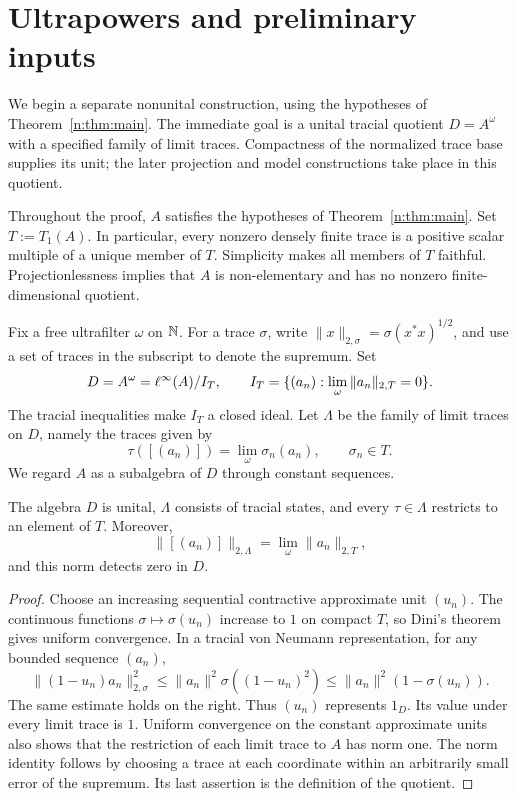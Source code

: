 \section{Ultrapowers and preliminary inputs}\label{n:sec:framework}

We begin a separate nonunital construction, using the hypotheses of Theorem~\ref{n:thm:main}. The immediate goal is a unital tracial quotient $D=A^\omega$ with a specified family of limit traces. Compactness of the normalized trace base supplies its unit; the later projection and model constructions take place in this quotient.

Throughout the proof, $A$ satisfies the hypotheses of
Theorem~\ref{n:thm:main}. Set $T:=T_1(A)$. In particular, every nonzero densely finite trace is
a positive scalar multiple of a unique member of $T$. Simplicity makes
all members of $T$ faithful. Projectionlessness implies that $A$ is
non-elementary and has no nonzero finite-dimensional quotient.

Fix a free ultrafilter $\omega$ on $\mathbb N$. For a trace $\sigma$, write
$\|x\|_{2,\sigma}=\sigma(x^*x)^{1/2}$, and use a set of traces in the
subscript to denote the supremum. Set
\[
 D=A^\omega=\ell^\infty(A)/I_T,\qquad
 I_T=\{(a_n):\lim_\omega\|a_n\|_{2,T}=0\}.
\]
The tracial inequalities make $I_T$ a closed ideal. Let $\Lambda$ be the family
of limit traces on $D$, namely the traces given by
\[
 \tau([(a_n)])=\lim_\omega\sigma_n(a_n),\qquad \sigma_n\in T.
\]
We regard $A$ as a subalgebra of $D$ through constant sequences.

\begin{lemma}\label{n:lem:unit}
The algebra $D$ is unital, $\Lambda$ consists of tracial states, and every
$\tau\in \Lambda$ restricts to an element of $T$. Moreover,
\[
 \|[(a_n)]\|_{2,\Lambda}=\lim_\omega\|a_n\|_{2,T},
\]
and this norm detects zero in $D$.
\end{lemma}
\begin{proof}
Choose an increasing sequential contractive approximate unit $(u_n)$.
The continuous functions $\sigma\mapsto\sigma(u_n)$ increase to $1$ on
compact $T$, so Dini's theorem gives uniform convergence. In a tracial
von Neumann representation, for any bounded sequence $(a_n)$,
\[
 \|(1-u_n)a_n\|_{2,\sigma}^2
 \le\|a_n\|^2\sigma((1-u_n)^2)
 \le\|a_n\|^2(1-\sigma(u_n)).
\]
The same estimate holds on the right. Thus $(u_n)$ represents $1_D$.
Its value under every limit trace is $1$. Uniform convergence on the
constant approximate units also shows that the restriction of each limit
trace to $A$ has norm one. The norm identity follows by choosing a
trace at each coordinate within an arbitrarily small error of the
supremum. Its last assertion is the definition of the quotient.
\end{proof}

